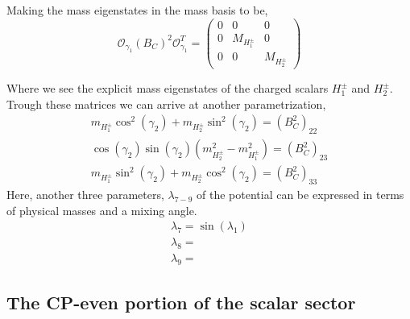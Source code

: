 Making the mass eigenstates in the mass basis to be, 
\begin{equation}
\mathcal{O}_{\gamma_1} \left( B_C \right)^2 \mathcal{O}_{\gamma_1}^T   = \begin{pmatrix}
0 & 0 & 0 \\ 
0 & M_{H_1^\pm} & 0 \\ 
0 & 0 & M_{H_2^\pm}
\end{pmatrix} 
\end{equation}

Where we see the explicit mass eigenstates of the charged scalars $H^\pm_1$ and $H^\pm_2$. Trough these matrices we can arrive at another parametrization, 
\begin{equation}
\begin{split}
m_{H^\pm_1} \cos^2(\gamma_2) + m_{H^\pm_2}  \sin^2(\gamma_2) = \left( B_C^2 \right)_{22}   \\
\cos(\gamma_2)\sin(\gamma_2)( m_{H^\pm_2}^2 - m_{H^\pm_1}^2  )  = \left( B_C^2 \right)_{23} \\ 
m_{H^\pm_1} \sin^2(\gamma_2) + m_{H^\pm_2}  \cos^2(\gamma_2) = \left( B_C^2 \right)_{33}
\end{split} 
\end{equation}
Here, another three parameters, $\lambda_{7-9}$ of the potential can be expressed in terms of physical masses and a mixing angle.
\begin{equation}
\begin{gathered}
\lambda_7 = \sin(\lambda_1) \\
\lambda_8 = \\
\lambda_9 = 
\end{gathered}
\end{equation}


\subsection{The CP-even portion of the scalar sector}

